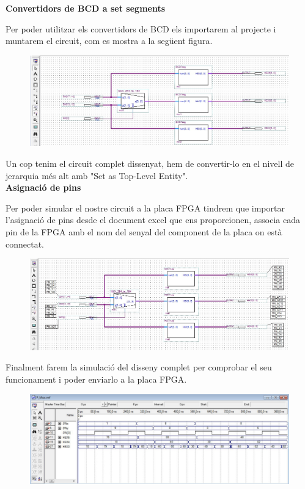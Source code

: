 \documentclass[12pt, a4papre]{article}
\begin{document}
	\textbf{\large{Convertidors de BCD a set segments}}
	
	Per poder utilitzar els convertidors de BCD els importarem al projecte i muntarem el circuit, com es mostra a la següent figura.
	
	\begin{figure}[H]
		\begin{center}
		\includegraphics[width=150mm]{bcd7.jpeg}
		\end{center}
	\end{figure}
	
	Un cop tenim el circuit complet dissenyat, hem de convertir-lo en el nivell de jerarquia més
alt amb "Set as Top-Level Entity".\\

	
	\textbf{\large{Asignació de pins}}	
	
	Per poder simular el nostre circuit a la placa FPGA tindrem que importar l'asignació de pins desde el document excel que ens proporcionen, associa cada pin de la FPGA amb el nom del senyal del component de la placa on està connectat. 
	\begin{figure}[H]
		\begin{center}
		\includegraphics[width=150mm]{bcd7segasign.jpeg}
		\end{center}
	\end{figure}
	
	Finalment farem la simulació del disseny complet per comprobar el seu funcionament i poder enviarlo a la placa FPGA.
	\begin{figure}[H]
		\begin{center}
		\includegraphics[width=150mm]{simulfinal.jpeg}
		\end{center}
	\end{figure}
	
\end{document}
